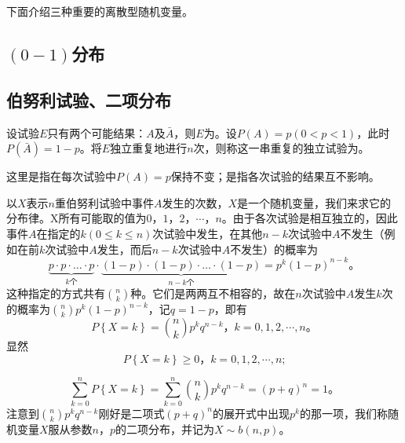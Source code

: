 下面介绍三种重要的离散型随机变量。

\subsection{$ (0-1) $分布}

\subsection{伯努利试验、二项分布}

\begin{definition}
	设试验$ E $只有两个可能结果：$ A $及$ \bar{A} $，则$ E $为。设$ P(A) = p (0<p<1) $，此时$ P(\bar{A}) = 1 - p $。将$ E $独立重复地进行$ n $次，则称这一串重复的独立试验为。
\end{definition}

这里是指在每次试验中$ P(A) = p $保持不变；是指各次试验的结果互不影响。

以$ X $表示$ n $重伯努利试验中事件$ A $发生的次数，$ X $是一个随机变量，我们来求它的分布律。X所有可能取的值为$ 0 $，$ 1 $，$ 2 $，$ \cdots $，$ n $。由于各次试验是相互独立的，因此事件$ A $在指定的$ k(0 \le k \le n) $次试验中发生，在其他$ n-k $次试验中$ A $不发生（例如在前$ k $次试验中$ A $发生，而后$ n-k $次试验中$ A $不发生）的概率为
\begin{equation}
	\underbrace{p \cdot p \cdot \dots \cdot p}_{k\text{个}} \cdot
	\underbrace{(1 - p) \cdot (1 - p) \cdot \dots \cdot (1 - p)}_{n - k\text{个}}
	= p^{k}(1-p)^{n-k} \text{。}
\end{equation}
这种指定的方式共有$ \binom{n}{k} $种。它们是两两互不相容的，故在$ n $次试验中$ A $发生$ k $次的概率为$ \binom{n}{k}p^{k}(1-p)^{n-k} $，记$ q = 1 - p $，即有
\begin{equation}\label{equation:binomial_distribution}
	P\left\lbrace X = k \right\rbrace = \binom{n}{k}p^{k}q^{n-k} \text{，} k = 0, 1, 2, \cdots , n \text{。}
\end{equation}
显然
\begin{equation}
	P\left\lbrace X = k \right\rbrace \ge 0 \text{，} k = 0, 1, 2, \cdots , n \text{;}
\end{equation}

\begin{equation}
	\sum\limits_{k=0}^{n}P\left\lbrace X = k \right\rbrace = \sum\limits_{k=0}^{n}\binom{n}{k}p^{k}q^{n-k} = (p+q)^{n} = 1\text{。}
\end{equation}
注意到$ \binom{n}{k}p^{k}q^{n-k} $刚好是二项式$ (p+q)^{n} $的展开式中出现$ p^k $的那一项，我们称随机变量$ X $服从参数$ n $，$ p $的二项分布，并记为$ X \sim b(n,p) $。

